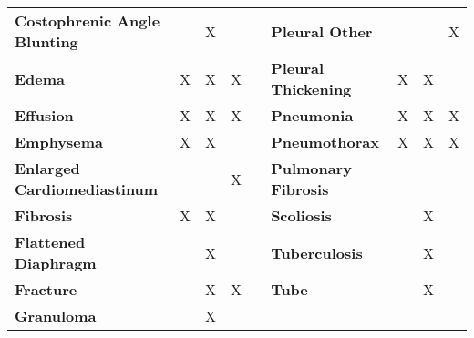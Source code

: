 \begin{table}[]
\begin{tabular}{lcccrlccc}
\textbf{Costophrenic   Angle Blunting} &  & X &  & \multicolumn{1}{l}{} & \textbf{Pleural Other} &  &  & X \\
\cellcolor[HTML]{E9ECE6}\textbf{Edema} & \cellcolor[HTML]{E9ECE6}X & \cellcolor[HTML]{E9ECE6}X & \cellcolor[HTML]{E9ECE6}X &  & \cellcolor[HTML]{E9ECE6}\textbf{Pleural Thickening} & \cellcolor[HTML]{E9ECE6}X & \cellcolor[HTML]{E9ECE6}X & \cellcolor[HTML]{E9ECE6} \\
\cellcolor[HTML]{E9ECE6}\textbf{Effusion} & \cellcolor[HTML]{E9ECE6}X & \cellcolor[HTML]{E9ECE6}X & \cellcolor[HTML]{E9ECE6}X &  & \cellcolor[HTML]{E9ECE6}\textbf{Pneumonia} & \cellcolor[HTML]{E9ECE6}X & \cellcolor[HTML]{E9ECE6}X & \cellcolor[HTML]{E9ECE6}X \\
\cellcolor[HTML]{E9ECE6}\textbf{Emphysema} & \cellcolor[HTML]{E9ECE6}X & \cellcolor[HTML]{E9ECE6}X & \cellcolor[HTML]{E9ECE6} &  & \cellcolor[HTML]{E9ECE6}\textbf{Pneumothorax} & \cellcolor[HTML]{E9ECE6}X & \cellcolor[HTML]{E9ECE6}X & \cellcolor[HTML]{E9ECE6}X \\
\cellcolor[HTML]{E9ECE6}\textbf{Enlarged   Cardiomediastinum} & \cellcolor[HTML]{E9ECE6} & \cellcolor[HTML]{E9ECE6} & \cellcolor[HTML]{E9ECE6}X & \multicolumn{1}{l}{} & \textbf{Pulmonary Fibrosis} &  &  &  \\
\cellcolor[HTML]{E9ECE6}\textbf{Fibrosis} & \cellcolor[HTML]{E9ECE6}X & \cellcolor[HTML]{E9ECE6}X & \cellcolor[HTML]{E9ECE6} &  & \textbf{Scoliosis} &  & X &  \\
\textbf{Flattened   Diaphragm} &  & X &  &  & \textbf{Tuberculosis} &  & X &  \\
\cellcolor[HTML]{E9ECE6}\textbf{Fracture} & \cellcolor[HTML]{E9ECE6} & \cellcolor[HTML]{E9ECE6}X & \cellcolor[HTML]{E9ECE6}X &  & \textbf{Tube} &  & X &  \\
\textbf{Granuloma} &  & X &  &  &  & \multicolumn{1}{l}{} & \multicolumn{1}{l}{} & \multicolumn{1}{l}{}
\end{tabular}
\end{table}



